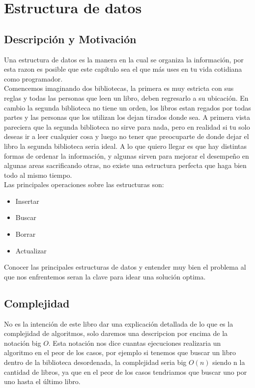 \chapter{Estructura de datos}
\section{Descripción y Motivación}

Una estructura de datos es la manera en la cual se organiza la información, por esta razon es posible que este capítulo sea el que más uses en tu vida cotidiana como programador.
\\Comencemos imaginando dos bibliotecas, la primera es muy estricta con sus reglas y todas las personas que leen un libro, deben regresarlo a su ubicación. En cambio la segunda biblioteca no tiene un orden, los libros estan regados por todas partes y las personas que los utilizan los dejan tirados donde sea. A primera vista pareciera que la segunda biblioteca no sirve para nada, pero en realidad si tu solo deseas ir a leer cualquier cosa y luego no tener que preocuparte de donde dejar el libro la segunda biblioteca seria ideal. A lo que quiero llegar es que hay distintas formas de ordenar la información, y algunas sirven para mejorar el desempeño en algunas areas sacrificando otras, no existe una estructura perfecta que haga bien todo al mismo tiempo.
\\Las principales operaciones sobre las estructuras son:
\begin{itemize}
    \item Insertar
    \item Buscar
    \item Borrar
    \item Actualizar
\end{itemize}
Conocer las principales estructuras de datos y entender muy bien el problema al que nos enfrentemos seran la clave para idear una solución optima.

\section{Complejidad}
No es la intención de este libro dar una explicación detallada de lo que es la complejidad de algoritmos, solo daremos una descripcion por encima de la notación big $O$. Esta notación nos dice cuantas ejecuciones realizaria un algoritmo en el peor de los casos, por ejemplo si tenemos que buscar un libro dentro de la biblioteca desordenada, la complejidad seria big $O(n)$ siendo n la cantidad de libros, ya que en el peor de los casos tendriamos que buscar uno por uno hasta el último libro.


